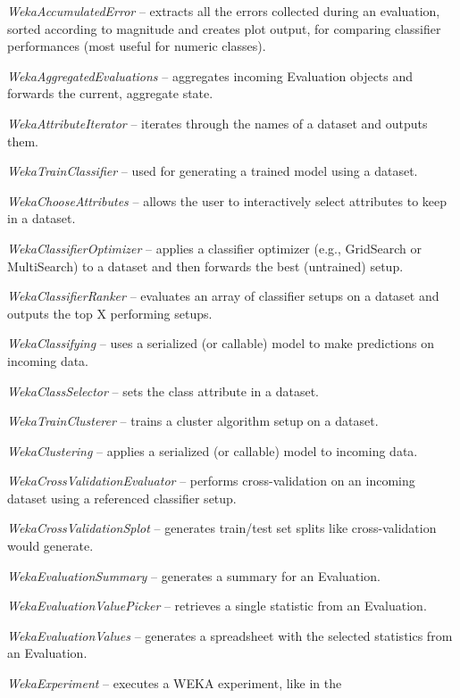 \begin{tight_itemize}
	\item \textit{WekaAccumulatedError} -- extracts all the errors
	collected during an evaluation, sorted according to magnitude and
	creates plot output, for comparing classifier performances (most useful
	for numeric classes).
	\item \textit{WekaAggregatedEvaluations} -- aggregates incoming
	Evaluation objects and forwards the current, aggregate state. 
	\item \textit{WekaAttributeIterator} -- iterates through the names of a
	dataset and outputs them.
	\item \textit{WekaTrainClassifier} -- used for generating a trained
	model using a dataset.
	\item \textit{WekaChooseAttributes} -- allows the user to interactively
	select attributes to keep in a dataset.
	\item \textit{WekaClassifierOptimizer} -- applies a classifier optimizer
	(e.g., GridSearch or MultiSearch) to a dataset and then forwards the best
	(untrained) setup.
	\item \textit{WekaClassifierRanker} -- evaluates an array of classifier
	setups on a dataset and outputs the top X performing setups.
	\item \textit{WekaClassifying} -- uses a serialized (or callable) model to
	make predictions on incoming data.
	\item \textit{WekaClassSelector} -- sets the class attribute in a dataset.
	\item \textit{WekaTrainClusterer} -- trains a cluster algorithm setup
	on a dataset.
	\item \textit{WekaClustering} -- applies a serialized (or callable) model
	to incoming data.
	\item \textit{WekaCrossValidationEvaluator} -- performs cross-validation
	on an incoming dataset using a referenced classifier setup.
	\item \textit{WekaCrossValidationSplot} -- generates train/test set splits
	like cross-validation would generate.
	\item \textit{WekaEvaluationSummary} -- generates a summary for an 
	Evaluation.
	\item \textit{WekaEvaluationValuePicker} -- retrieves a single statistic
	from an Evaluation.
	\item \textit{WekaEvaluationValues} -- generates a spreadsheet with the
	selected statistics from an Evaluation.
	\item \textit{WekaExperiment} -- executes a WEKA experiment, like in the 

\end{tight_itemize}
